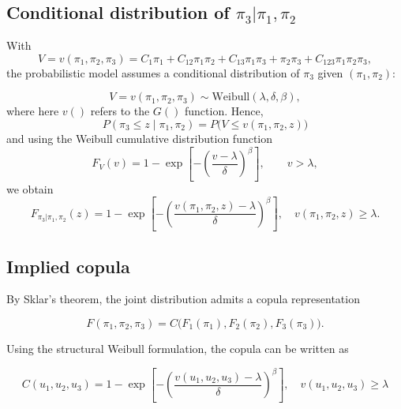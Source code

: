 \subsection{Conditional distribution of \(\pi_3|\pi_1,\pi_2\)}

With
\begin{equation}
V=v(\pi_1,\pi_2,\pi_3)
=
C_1\pi_{1}
+ C_{12}\pi_{1}\pi_{2}
+ C_{13}\pi_{1}\pi_{3}
+ \pi_{2}\pi_{3}
+ C_{123}\pi_{1}\pi_{2}\pi_{3},
\end{equation}
the probabilistic model assumes a conditional distribution of \(\pi_3\) given \((\pi_1,\pi_2)\):

\begin{equation}
V = v(\pi_1,\pi_2,\pi_3) \sim \text{Weibull}(\lambda,\delta,\beta),
\end{equation}
where here $v()$ refers to the $G()$ function.
Hence,
\begin{equation}
P(\pi_3 \le z \mid \pi_1,\pi_2)
=
P\bigl(V \le v(\pi_1,\pi_2,z)\bigr)
\end{equation}
and using the Weibull cumulative distribution function
\begin{equation}
F_V(v)
=
1 -
\exp\!\left[
-\left(\frac{v-\lambda}{\delta}\right)^\beta
\right],
\qquad v>\lambda,
\end{equation}
we obtain
\begin{equation}\label{eq:condcdf}
\boxed{
F_{\pi_3|\pi_1,\pi_2}(z)
=
1 -
\exp\!\left[
-
\left(
\frac{
v(\pi_1,\pi_2,z)-\lambda
}{\delta}
\right)^\beta
\right], \quad v(\pi_1,\pi_2,z)\ge \lambda.
}
\end{equation}

\subsection{Implied copula}

By Sklar’s theorem, the joint distribution admits a copula representation

\begin{equation}
F(\pi_1,\pi_2,\pi_3)
=
C\bigl(F_1(\pi_1),F_2(\pi_2),F_3(\pi_3)\bigr).
\end{equation}

Using the structural Weibull formulation, the copula can be written as

\begin{equation}\label{eq:associatedcopula}
\boxed{
C(u_1,u_2,u_3)
=
1 -
\exp\!\left[
-
\left(
\frac{
v(u_1,u_2,u_3)-\lambda
}{\delta}
\right)^\beta
\right],\quad v(u_1,u_2,u_3)\ge \lambda
}
\end{equation}

